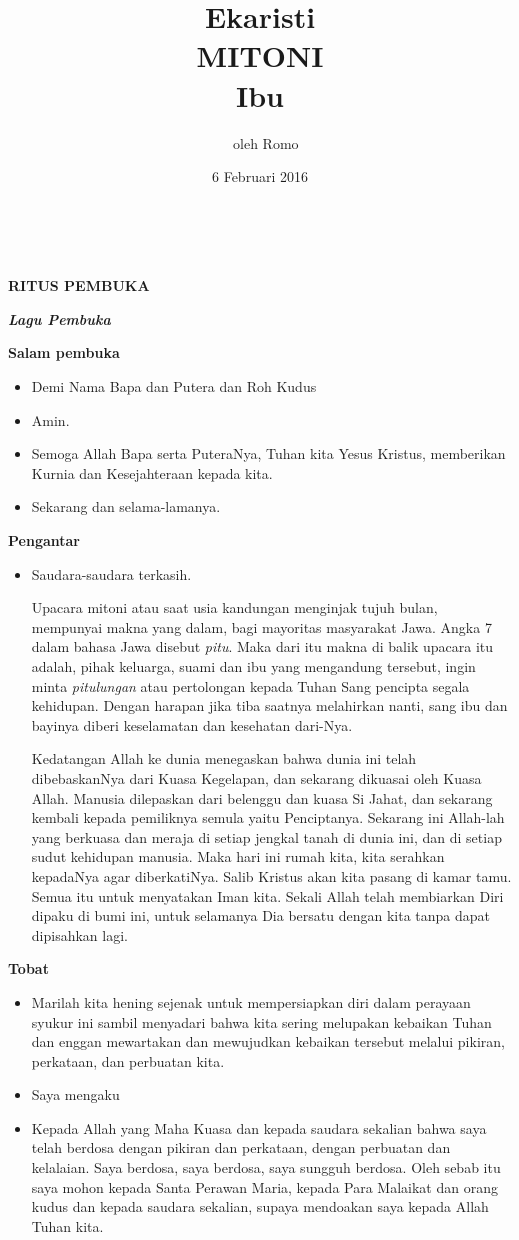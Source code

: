 \documentclass[12pt,twoside]{book}
\title{Ekaristi \vspace{1cm}\\MITONI\\ 
Ibu \calonibu \\ 
}
\author{
{~}\vspace{4cm}
oleh Romo \romo
}
\date{6 Februari 2016}
\makeatletter
\newcommand{\judul}[1]{%
  {\parindent \z@ \centering \normalfont
    \interlinepenalty\@M \large \bfseries #1\par\nobreak \vskip 20\p@ }}
\newcommand{\subjudul}[1]{%
  {\parindent \z@ \normalfont
    \interlinepenalty\@M \bfseries #1\par\nobreak \vskip 20\p@ }}
\newcommand{\lagu}[1]{%
  {\parindent \z@ \normalfont
    \interlinepenalty\@M \bfseries \emph{#1}\par\nobreak \vskip 20\p@ }}
\newcommand{\BU}[1]{\begin{itemize} \item[U:] #1 \end{itemize}}
\newcommand{\BI}[1]{\begin{itemize} \item[I:] #1 \end{itemize}}
\makeatother
\begin{document}
\maketitle
\Large  
\thispagestyle{empty}
{~}\newpage
\thispagestyle{empty}
\judul{RITUS PEMBUKA}
\lagu{Lagu Pembuka}


\subjudul{Salam pembuka}

\BI{Demi Nama Bapa dan Putera dan Roh Kudus}
\BU{Amin.}
\BI{Semoga Allah Bapa serta PuteraNya, Tuhan kita Yesus Kristus, memberikan Kurnia dan Kesejahteraan kepada kita.}
\BU{Sekarang dan selama-lamanya.}

\subjudul{Pengantar}

\BI{Saudara-saudara terkasih. 

Upacara mitoni atau saat usia kandungan menginjak tujuh bulan, mempunyai makna yang dalam, bagi mayoritas masyarakat Jawa. Angka 7 dalam bahasa Jawa disebut \textit{pitu}. Maka dari itu makna di balik upacara itu adalah, pihak keluarga, suami dan ibu yang mengandung tersebut, ingin minta \textit{pitulungan} atau pertolongan kepada Tuhan Sang pencipta segala kehidupan. Dengan harapan jika tiba saatnya melahirkan nanti, sang ibu dan bayinya diberi keselamatan dan kesehatan dari-Nya.

Kedatangan Allah ke dunia menegaskan bahwa dunia ini telah dibebaskanNya dari Kuasa Kegelapan, dan sekarang dikuasai oleh Kuasa Allah. Manusia dilepaskan dari belenggu dan kuasa Si Jahat, dan sekarang kembali kepada pemiliknya semula yaitu Penciptanya. Sekarang ini Allah-lah yang berkuasa dan meraja di setiap jengkal tanah di dunia ini, dan di setiap sudut kehidupan manusia. Maka hari ini rumah kita, kita serahkan kepadaNya agar diberkatiNya. Salib Kristus akan kita pasang di kamar tamu. Semua itu untuk menyatakan Iman kita. Sekali Allah telah membiarkan Diri dipaku di bumi ini, untuk selamanya Dia bersatu dengan kita tanpa dapat dipisahkan lagi.}

\subjudul{Tobat}
\BI{Marilah kita hening sejenak untuk mempersiapkan diri dalam perayaan syukur ini sambil menyadari bahwa kita sering melupakan kebaikan Tuhan dan enggan mewartakan dan mewujudkan kebaikan tersebut melalui pikiran, perkataan, dan perbuatan kita.}

\BI{Saya mengaku}

\BU{Kepada Allah yang Maha Kuasa dan kepada saudara sekalian bahwa saya telah berdosa dengan pikiran dan perkataan, dengan perbuatan dan kelalaian. Saya berdosa, saya berdosa, saya sungguh berdosa. Oleh sebab itu saya mohon kepada Santa Perawan Maria, kepada Para Malaikat dan orang kudus dan kepada saudara sekalian, supaya mendoakan saya kepada Allah Tuhan kita.}
\end{document}
